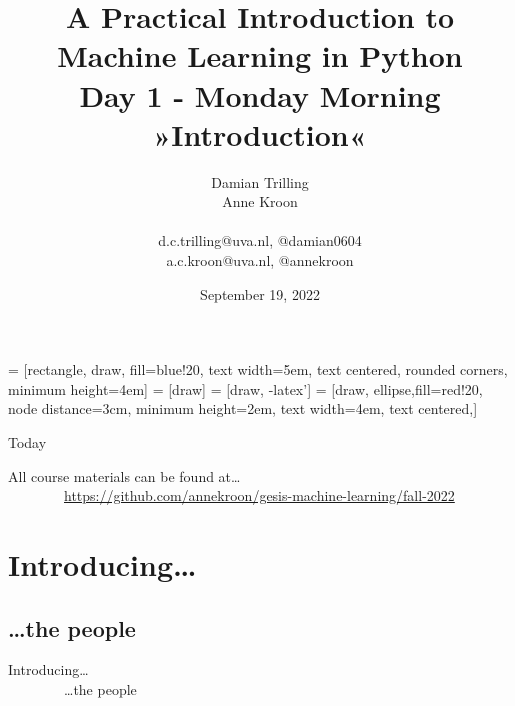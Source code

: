 \documentclass[handout]{beamer}
\title[Big Data and Automated Content Analysis]{\textbf{A Practical Introduction to Machine Learning in Python} \\Day 1 - Monday  Morning\\ »Introduction«}
\author[Damian Trilling, Anne Kroon]{Damian Trilling \\ Anne Kroon \\ ~ \\ \footnotesize{d.c.trilling@uva.nl, @damian0604 \\a.c.kroon@uva.nl, @annekroon} \\}
\date{September 19, 2022}
\institute[Gesis]{Gesis}
\begin{document}
 = [rectangle, draw, fill=blue!20, 
text width=5em, text centered, rounded corners, minimum height=4em]
 = [draw]
 = [draw, -latex']
 = [draw, ellipse,fill=red!20, node distance=3cm,
minimum height=2em, text width=4em, text centered,]




\begin{frame}{}
\titlepage
\end{frame}

\begin{frame}{Today}
\tableofcontents
\end{frame}


\begin{frame} 
All course materials can be found at\ldots \\
~~~~~~~~\url{https://github.com/annekroon/gesis-machine-learning/fall-2022}
\end{frame}

\section{Introducing\ldots}
\subsection{\ldots the people}

\begin{frame} 
Introducing\ldots \\
~~~~~~~~\ldots the people
\end{frame}
\end{document}
